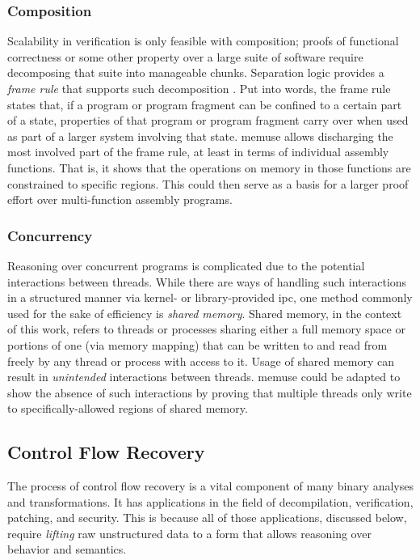 \subsubsection{Composition}\label{sse:composition}
Scalability in verification is only feasible with composition; proofs of functional correctness or some other property over a large suite of software require decomposing that suite into manageable chunks.
Separation logic provides a \emph{frame rule} that supports such%
decomposition \autocite{o2001local,reynolds2002separation,krebbers2017essence}.
Put into words, the frame rule states that,
if a program or program fragment can be confined to a certain part of a state, properties of that program or program fragment carry over when used as part of a larger system involving that state.
\Gls{memuse} allows discharging the most involved part of the frame rule, at least in terms of individual assembly functions.
That is, it shows that the operations on memory in those functions are constrained to specific regions.
This could then serve as a basis for a larger proof effort over multi-function assembly programs.

\subsubsection{Concurrency}
Reasoning over concurrent programs is complicated due to the potential interactions between threads.
While there are ways of handling such interactions in a structured manner via kernel- or library-provided \ac{ipc}, one method commonly used for the sake of efficiency is \emph{shared memory}.
Shared memory, in the context of this work, refers to threads or processes sharing either a full memory space or portions of one (via memory mapping) that can be written to and read from freely by any thread or process with access to it.
Usage of shared memory can result in \emph{unintended} interactions between threads.
\Gls{memuse} could be adapted to show the absence of such interactions by proving that multiple threads only write to specifically-allowed regions of shared memory.

\subsection{Control Flow Recovery}
The process of control flow recovery is a vital component of many binary analyses and transformations. It has applications in the field of decompilation, verification, patching, and security.
This is because all of those applications, discussed below, require \emph{lifting} raw unstructured data to a form that allows reasoning over behavior and semantics.

